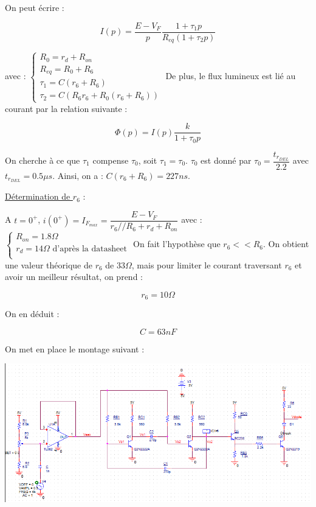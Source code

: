 \documentclass[a4paper]{report}
\begin{document}
On peut écrire :

$$I(p) = \dfrac{E-V_F}{p}\dfrac{1+\tau_1p}{R_{eq}(1+\tau_2p)}$$

avec :
\newline
\newline
$\left\{
\begin{array}{l}
  R_0 = r_d + R_{on}\\
  R_{eq} = R_0 + R_6\\
  \tau_1 = C(r_6+R_6)\\
  \tau_2 = C(R_6r_6 + R_0(r_6+R_6))
\end{array}
\right.$
\newline
\newline
De plus, le flux lumineux est lié au courant par la relation suivante : 

$$\Phi(p) =I(p) \dfrac{k}{1+\tau_0p}$$

On cherche  à ce que $\tau_1$ compense $\tau_0$, soit $\tau_1 = \tau_0$.
$\tau_0$ est donné par $\tau_0 = \dfrac{t_{r_{DEL}}}{2.2}$ avec $t_{r_{DEL}} = 0.5\mu s$.
Ainsi, on a : $C(r_6+R_6) = 227ns$.\newline

\underline{Détermination de $r_6$} :\newline

A $t = 0^+$, $i(0^+) = I_{F_{max}} = \dfrac{E-V_F}{r_6//R_6 + r_d + R_{on}}$ avec :\newline
\newline
$\left\{
\begin{array}{l}
  R_{on} = 1.8\Omega\\
  r_d = 14\Omega \mbox{    d'après la datasheet}\\
\end{array}
\right.$
\newline
On fait l'hypothèse que $r_6<<R_6$. On obtient une valeur théorique de $r_6$ de $33\Omega$, mais pour limiter le courant traversant $r_6$ et avoir un meilleur résultat, on prend :

$$r_6 = 10\Omega$$

On en déduit :

$$C = 63nF$$

On met en place le montage suivant :

\begin{center}
\includegraphics[width=1\textwidth]{Montage_DEL.PNG}
\end{center}
\end{document}
